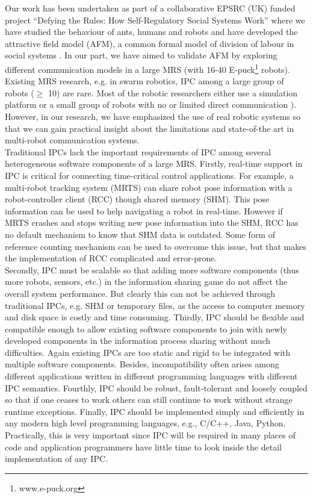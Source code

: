 \documentclass{ifacconf}
\begin{document}
Our work has been undertaken as part of a collaborative EPSRC (UK) funded project ``Defying the Rules: How Self-Regulatory Social Systems Work'' where we have studied the behaviour of ants, humans and robots and have developed the attractive field model (AFM), a common formal model of division of labour in social systems \citep{Arcaute+2008}. In our part, we have aimed to validate AFM by exploring different communication models in a large MRS (with 16-40 E-puck\footnote{www.e-puck.org} robots).  Existing MRS research, e.g. in swarm robotics, IPC among a large group of robots ($\geq$ 10) are rare. Most of the robotic researchers either use a simulation platform or a small group of robots with no or limited direct communication \citep[e.g. ][]{Labella2007}).   However, in our research, we have emphasized the use of real robotic systems so that we can gain practical insight about the limitations and state-of-the art in multi-robot communication systems.\\
Traditional IPCs lack the important requirements of IPC among several heterogeneous software components of a large MRS. Firstly, real-time support in IPC is critical for connecting time-critical control applications. For example, a multi-robot tracking system (MRTS) can share robot pose information with a robot-controller client (RCC) though shared memory (SHM). This pose information can be used to help navigating a robot in real-time. However if MRTS crashes and stops writing new pose information into the SHM, RCC has no default mechanism to know that SHM data is outdated. Some form of reference counting mechanism can be used to overcome this issue, but that makes the implementation of RCC complicated and error-prone.\\
Secondly, IPC must be scalable so that adding more software components (thus more robots, sensors, etc.) in the information sharing game do not affect the overall system performance. But clearly this can not be achieved through traditional IPCs, e.g. SHM or temporary files,  as the access to computer memory and disk space is costly and time consuming. Thirdly, IPC should be flexible and compatible enough to allow existing software components to join with newly developed components in the information process sharing without much difficulties. Again existing IPCs are too static and rigid to be integrated with multiple software components. Besides, incompatibility often arises among different applications written in different programming languages with different  IPC semantics. Fourthly, IPC should be robust, fault-tolerant and loosely coupled so that if one ceases to work others can still continue to work without strange runtime exceptions. Finally, IPC should be implemented simply and efficiently in any modern high level programming languages, e.g., C/C++, Java, Python. Practically, this is very important since IPC will be required in many places of code and application programmers have little time to look inside the detail implementation of any IPC.\\
\end{document}
